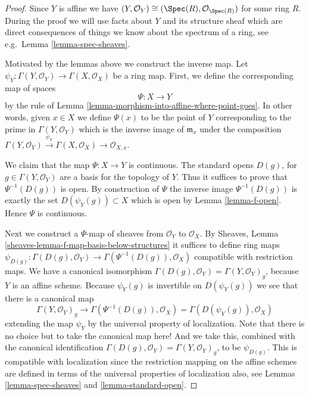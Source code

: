 \begin{proof}
Since $Y$ is affine we have
$(Y, \mathcal{O}_Y) \cong (\Spec(R), \mathcal{O}_{\Spec(R)})$
for some ring $R$.
During the proof we will use facts about $Y$ and
its structure sheaf which are direct consequences of things
we know about the spectrum of a ring, see e.g.\ Lemma
\ref{lemma-spec-sheaves}.

\medskip\noindent
Motivated by the lemmas above we construct the inverse map.
Let $\psi_Y : \Gamma(Y, \mathcal{O}_Y) \to \Gamma(X, \mathcal{O}_X)$
be a ring map. First, we define the corresponding map of
spaces
$$
\Psi : X \longrightarrow Y
$$
by the rule of
Lemma \ref{lemma-morphism-into-affine-where-point-goes}.
In other words, given $x \in X$ we define $\Psi(x)$
to be the point of $Y$ corresponding to the prime
in $\Gamma(Y, \mathcal{O}_Y)$ which is the inverse
image of $\mathfrak m_x$ under the composition
$
\Gamma(Y, \mathcal{O}_Y) \xrightarrow{\psi_Y}
\Gamma(X, \mathcal{O}_X) \to
\mathcal{O}_{X, x}
$.

\medskip\noindent
We claim that the map $\Psi : X \to Y$ is continuous.
The standard opens $D(g)$, for $g \in \Gamma(Y, \mathcal{O}_Y)$
are a basis for the topology of $Y$. Thus it suffices to prove
that $\Psi^{-1}(D(g))$ is open. By construction of $\Psi$
the inverse image $\Psi^{-1}(D(g))$ is exactly the set
$D(\psi_Y(g)) \subset X$ which is open by Lemma \ref{lemma-f-open}.
Hence $\Psi$ is continuous.

\medskip\noindent
Next we construct a $\Psi$-map of sheaves from
$\mathcal{O}_Y$ to $\mathcal{O}_X$. By
Sheaves, Lemma \ref{sheaves-lemma-f-map-basis-below-structures}
it suffices to define ring maps
$\psi_{D(g)} : \Gamma(D(g), \mathcal{O}_Y) \to
\Gamma(\Psi^{-1}(D(g)), \mathcal{O}_X)$
compatible with restriction maps.
We have a canonical isomorphism
$\Gamma(D(g), \mathcal{O}_Y) = \Gamma(Y, \mathcal{O}_Y)_g$,
because $Y$ is an affine scheme.
Because $\psi_Y(g)$ is invertible on $D(\psi_Y(g))$
we see that there is a canonical map
$$
\Gamma(Y, \mathcal{O}_Y)_g
\longrightarrow
\Gamma(\Psi^{-1}(D(g)), \mathcal{O}_X)
=
\Gamma(D(\psi_Y(g)), \mathcal{O}_X)
$$
extending the map $\psi_Y$
by the universal property of localization.
Note that there is no choice but to take the canonical map here!
And we take this, combined
with the canonical identification
$\Gamma(D(g), \mathcal{O}_Y) = \Gamma(Y, \mathcal{O}_Y)_g$, to
be $\psi_{D(g)}$. This is compatible with localization since the
restriction mapping on the affine schemes are defined in terms
of the universal properties of localization also, see
Lemmas \ref{lemma-spec-sheaves} and \ref{lemma-standard-open}.


\end{proof}
